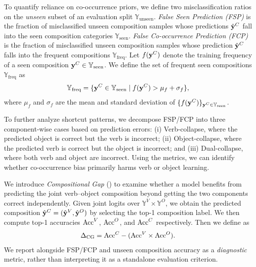 To quantify reliance on co-occurrence priors, we define two misclassification ratios on the \emph{unseen} subset of an evaluation split $\mathbb{Y}_{\text{unseen}}$.
\emph{False Seen Prediction (FSP)} is the fraction of misclassified unseen composition samples whose predictions $\hat{\mathbf{y}}^C$ fall into the seen composition categories $\mathbb{Y}_{\text{seen}}$.
\emph{False Co-occurrence Prediction (FCP)} is the fraction of misclassified unseen composition samples whose prediction $\hat{\mathbf{y}}^C$ falls into the frequent compositions $\mathbb{Y}_{\text{freq}}$.
Let $f(\mathbf{y}^C)$ denote the training frequency of a seen composition $\mathbf{y}^C \in \mathbb{Y}_{\text{seen}}$.
We define the set of frequent seen compositions $\mathbb{Y}_{\text{freq}}$ as
\begin{equation}
    \mathbb{Y}_{\text{freq}}=\{\mathbf{y}^C \in\mathbb{Y}_{\text{seen}} \mid f(\mathbf{y}^C) > \mu_f + \sigma_f\},    
    \label{eq:freq}
\end{equation}
where $\mu_f$ and $\sigma_f$ are the mean and standard deviation of $\{f(\mathbf{y}^C)\}_{\mathbf{y}^C\in\mathbb{Y}_{\text{seen}}}$.

To further analyze shortcut patterns, we decompose FSP/FCP into three component-wise cases based on prediction errors:
(i) Verb-collapse, where the predicted object is correct but the verb is incorrect;
(ii) Object-collapse, where the predicted verb is correct but the object is incorrect; and
(iii) Dual-collapse, where both verb and object are incorrect.
Using the metrics, we can identify whether co-occurrence bias primarily harms verb or object learning.



We introduce \textit{Compositional Gap} (\cg{}) to examine whether a model benefits from predicting the joint verb--object composition beyond getting the two components correct independently.
Given joint logits over $\mathbb{Y}^V \times \mathbb{Y}^O$, we obtain the predicted composition $\hat{\mathbf{y}}^C =(\hat{\mathbf{y}}^V,\hat{\mathbf{y}}^O)$ by selecting the top-1 composition label.
We then compute top-1 accuracies $\mathrm{Acc}^{V}$, $\mathrm{Acc}^{O}$, and $\mathrm{Acc}^{C}$ respectively.
Then we define \cg{} as
\begin{equation}
    \Delta_{\text{CG}} = \mathrm{Acc}^{C} - (\mathrm{Acc}^{V} \times \mathrm{Acc}^{O}).
    \label{eq:cg}
\end{equation}
We report \cg{} alongside FSP/FCP and unseen composition accuracy as a \emph{diagnostic} metric, rather than interpreting it as a standalone evaluation criterion.






